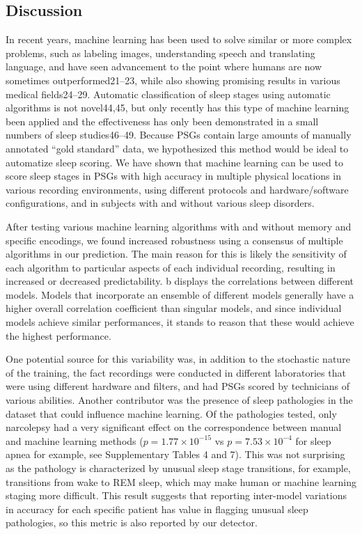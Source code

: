 \subsection{Discussion}
In recent years, machine learning has been used to solve similar or more complex problems, such as labeling images, understanding speech and translating language, and have seen advancement to the point where humans are now sometimes outperformed21–23, while also showing promising results in various medical fields24–29.
Automatic classification of sleep stages using automatic algorithms is not novel44,45, but only recently has this type of machine learning been applied and the effectiveness has only been demonstrated in a small numbers of sleep studies46–49. 
Because PSGs contain large amounts of manually annotated “gold standard” data, we hypothesized this method would be ideal to
automatize sleep scoring.
We have shown that machine learning can be used to score sleep stages in PSGs with high accuracy in multiple physical locations in various recording environments, using different protocols and hardware/software configurations, and in subjects with and without various sleep disorders.

After testing various machine learning algorithms with and without memory and specific encodings, we found increased robustness using a consensus of multiple algorithms in our prediction.
The main reason for this is likely the sensitivity of each algorithm to particular aspects of each individual recording, resulting in increased or decreased predictability.
b displays the correlations between different models.
Models that incorporate an ensemble of different models generally have a higher overall correlation coefficient than singular models, and since individual models achieve similar performances, it stands to reason that these would achieve the highest performance.

One potential source for this variability was, in addition to the stochastic nature of the training, the fact recordings were conducted in different laboratories that were using different hardware and filters, and had PSGs scored by technicians of various abilities.
Another contributor was the presence of sleep pathologies in the dataset that could influence machine learning.
Of the pathologies tested, only narcolepsy had a very significant effect on the correspondence between manual and machine learning methods ($p=1.77 \times 10^{-15}$ vs $p=7.53 \times 10^{-4}$ for sleep apnea for example, see Supplementary Tables 4 and 7).
This was not surprising as the pathology is characterized by unusual sleep stage transitions, for example, transitions from wake to REM sleep, which may make human or machine learning staging more difficult.
This result suggests that reporting inter-model variations in accuracy for each specific patient has value in flagging unusual sleep pathologies, so this metric is also reported by our detector.


